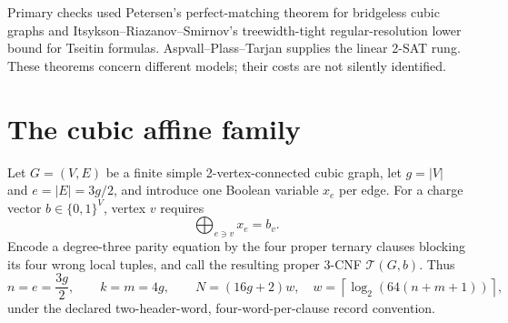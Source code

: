 \documentclass[11pt]{article}
\begin{document}
Primary checks used Petersen's perfect-matching theorem for bridgeless cubic graphs and Itsykson--Riazanov--Smirnov's treewidth-tight regular-resolution lower bound for Tseitin formulas. Aspvall--Plass--Tarjan supplies the linear 2-SAT rung. These theorems concern different models; their costs are not silently identified.

\section{The cubic affine family}
Let $G=(V,E)$ be a finite simple 2-vertex-connected cubic graph, let $g=|V|$ and $e=|E|=3g/2$, and introduce one Boolean variable $x_e$ per edge. For a charge vector $b\in\{0,1\}^{V}$, vertex $v$ requires
\[
  \bigoplus_{e\ni v}x_e=b_v.
\]
Encode a degree-three parity equation by the four proper ternary clauses blocking its four wrong local tuples, and call the resulting proper 3-CNF $\mathcal T(G,b)$. Thus
\[
 n=e=\frac{3g}{2},\qquad k=m=4g,
 \qquad N=(16g+2)w,
 \quad w=\left\lceil\log_2(64(n+m+1))\right\rceil,
\]
under the declared two-header-word, four-word-per-clause record convention.
\end{document}
